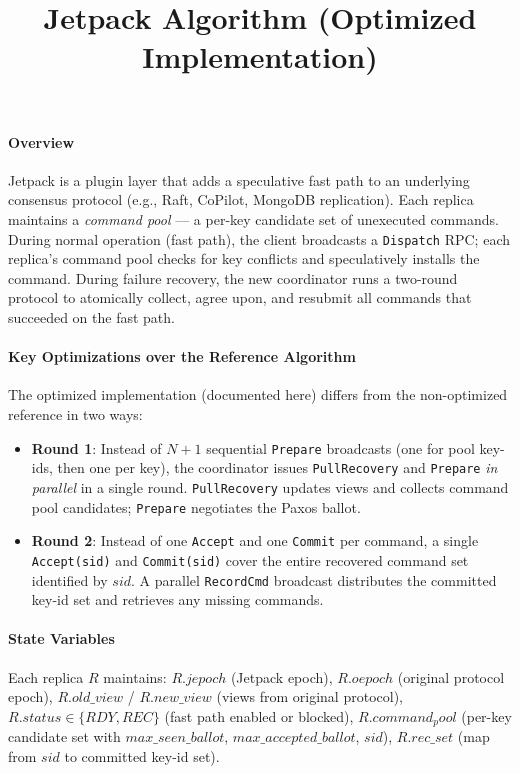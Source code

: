 \documentclass[twocolumn]{article}
\begin{document}
\title{Jetpack Algorithm (Optimized Implementation)}
\maketitle

\paragraph{Overview}
Jetpack is a plugin layer that adds a speculative fast path to an underlying consensus protocol (e.g., Raft, CoPilot, MongoDB replication). Each replica maintains a \emph{command pool} — a per-key candidate set of unexecuted commands. During normal operation (fast path), the client broadcasts a \texttt{Dispatch} RPC; each replica's command pool checks for key conflicts and speculatively installs the command. During failure recovery, the new coordinator runs a two-round protocol to atomically collect, agree upon, and resubmit all commands that succeeded on the fast path.

\paragraph{Key Optimizations over the Reference Algorithm}
The optimized implementation (documented here) differs from the non-optimized reference in two ways:
\begin{itemize}
  \setlength{\itemsep}{0pt}
  \item \textbf{Round 1}: Instead of $N+1$ sequential \texttt{Prepare} broadcasts (one for pool key-ids, then one per key), the coordinator issues \texttt{PullRecovery} and \texttt{Prepare} \emph{in parallel} in a single round. \texttt{PullRecovery} updates views and collects command pool candidates; \texttt{Prepare} negotiates the Paxos ballot.
  \item \textbf{Round 2}: Instead of one \texttt{Accept} and one \texttt{Commit} per command, a single \texttt{Accept(sid)} and \texttt{Commit(sid)} cover the entire recovered command set identified by $sid$. A parallel \texttt{RecordCmd} broadcast distributes the committed key-id set and retrieves any missing commands.
\end{itemize}

\paragraph{State Variables}
Each replica $R$ maintains:
$R.jepoch$ (Jetpack epoch), $R.oepoch$ (original protocol epoch),
$R.old\_view$ / $R.new\_view$ (views from original protocol),
$R.status \in \{RDY, REC\}$ (fast path enabled or blocked),
$R.command_pool$ (per-key candidate set with $max\_seen\_ballot$, $max\_accepted\_ballot$, $sid$),
$R.rec\_set$ (map from $sid$ to committed key-id set).
\end{document}

